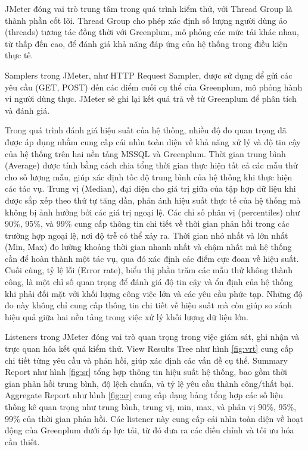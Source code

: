 JMeter đóng vai trò trung tâm trong quá trình kiểm thử, với Thread Group là thành phần cốt lõi. Thread Group cho phép xác định số lượng người dùng ảo (threads) tương tác đồng thời với Greenplum, mô phỏng các mức tải khác nhau, từ thấp đến cao, để đánh giá khả năng đáp ứng của hệ thống trong điều kiện thực tế.

Samplers trong JMeter, như HTTP Request Sampler, được sử dụng để gửi các yêu cầu (GET, POST) đến các điểm cuối cụ thể của Greenplum, mô phỏng hành vi người dùng thực. JMeter sẽ ghi lại kết quả trả về từ Greenplum để phân tích và đánh giá.

Trong quá trình đánh giá hiệu suất của hệ thống, nhiều độ đo quan trọng đã được áp dụng nhằm cung cấp cái nhìn toàn diện về khả năng xử lý và độ tin cậy của hệ thống trên hai nền tảng MSSQL và Greenplum. Thời gian trung bình (Average) được tính bằng cách chia tổng thời gian thực hiện tất cả các mẫu thử cho số lượng mẫu, giúp xác định tốc độ trung bình của hệ thống khi thực hiện các tác vụ. Trung vị (Median), đại diện cho giá trị giữa của tập hợp dữ liệu khi được sắp xếp theo thứ tự tăng dần, phản ánh hiệu suất thực tế của hệ thống mà không bị ảnh hưởng bởi các giá trị ngoại lệ. Các chỉ số phân vị (percentiles) như 90\%, 95\%, và 99\% cung cấp thông tin chi tiết về thời gian phản hồi trong các trường hợp ngoại lệ, nơi độ trễ có thể xảy ra. Thời gian nhỏ nhất và lớn nhất (Min, Max) đo lường khoảng thời gian nhanh nhất và chậm nhất mà hệ thống cần để hoàn thành một tác vụ, qua đó xác định các điểm cực đoan về hiệu suất. Cuối cùng, tỷ lệ lỗi (Error rate), biểu thị phần trăm các mẫu thử không thành công, là một chỉ số quan trọng để đánh giá độ tin cậy và ổn định của hệ thống khi phải đối mặt với khối lượng công việc lớn và các yêu cầu phức tạp. Những độ đo này không chỉ cung cấp thông tin chi tiết về hiệu suất mà còn giúp so sánh hiệu quả giữa hai nền tảng trong việc xử lý khối lượng dữ liệu lớn.

Listeners trong JMeter đóng vai trò quan trọng trong việc giám sát, ghi nhận và trực quan hóa kết quả kiểm thử. View Results Tree như hình \ref{fig:vrt} cung cấp chi tiết từng yêu cầu và phản hồi, giúp xác định các vấn đề cụ thể. Summary Report như hình \ref{fig:sr} tổng hợp thông tin hiệu suất hệ thống, bao gồm thời gian phản hồi trung bình, độ lệch chuẩn, và tỷ lệ yêu cầu thành công/thất bại. Aggregate Report như hình \ref{fig:ar} cung cấp dạng bảng tổng hợp các số liệu thống kê quan trọng như trung bình, trung vị, min, max, và phân vị 90\%, 95\%, 99\% của thời gian phản hồi. Các listener này cung cấp cái nhìn toàn diện về hoạt động của Greenplum dưới áp lực tải, từ đó đưa ra các điều chỉnh và tối ưu hóa cần thiết.



